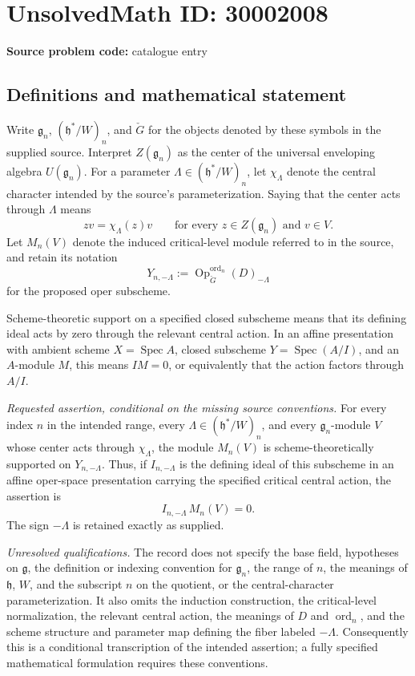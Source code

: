 \documentclass[11pt]{article}
\begin{document}
\section*{UnsolvedMath ID: 30002008}
\textbf{Source problem code:} catalogue entry
\subsection{Definitions and mathematical statement}
Write \(\mathfrak g_n\), \((\mathfrak h^*/W)_n\), and \(\check G\) for the objects denoted by these symbols in the supplied source. Interpret \(Z(\mathfrak g_n)\) as the center of the universal enveloping algebra \(U(\mathfrak g_n)\). For a parameter \(\Lambda\in(\mathfrak h^*/W)_n\), let \(\chi_\Lambda\) denote the central character intended by the source's parameterization. Saying that the center acts through \(\Lambda\) means
\[
zv=\chi_\Lambda(z)v
\qquad\text{for every }z\in Z(\mathfrak g_n)\text{ and }v\in V.
\]
Let \(M_n(V)\) denote the induced critical-level module referred to in the source, and retain its notation
\[
Y_{n,-\Lambda}:=\operatorname{Op}^{\operatorname{ord}_n}_{\check G}(D)_{-\Lambda}
\]
for the proposed oper subscheme.

Scheme-theoretic support on a specified closed subscheme means that its defining ideal acts by zero through the relevant central action. In an affine presentation with ambient scheme \(X=\operatorname{Spec}A\), closed subscheme \(Y=\operatorname{Spec}(A/I)\), and an \(A\)-module \(M\), this means \(IM=0\), or equivalently that the action factors through \(A/I\).

\emph{Requested assertion, conditional on the missing source conventions.} For every index \(n\) in the intended range, every \(\Lambda\in(\mathfrak h^*/W)_n\), and every \(\mathfrak g_n\)-module \(V\) whose center acts through \(\chi_\Lambda\), the module \(M_n(V)\) is scheme-theoretically supported on \(Y_{n,-\Lambda}\). Thus, if \(I_{n,-\Lambda}\) is the defining ideal of this subscheme in an affine oper-space presentation carrying the specified critical central action, the assertion is
\[
I_{n,-\Lambda}\,M_n(V)=0.
\]
The sign \(-\Lambda\) is retained exactly as supplied.

\emph{Unresolved qualifications.} The record does not specify the base field, hypotheses on \(\mathfrak g\), the definition or indexing convention for \(\mathfrak g_n\), the range of \(n\), the meanings of \(\mathfrak h\), \(W\), and the subscript \(n\) on the quotient, or the central-character parameterization. It also omits the induction construction, the critical-level normalization, the relevant central action, the meanings of \(D\) and \(\operatorname{ord}_n\), and the scheme structure and parameter map defining the fiber labeled \(-\Lambda\). Consequently this is a conditional transcription of the intended assertion; a fully specified mathematical formulation requires these conventions.
\end{document}
